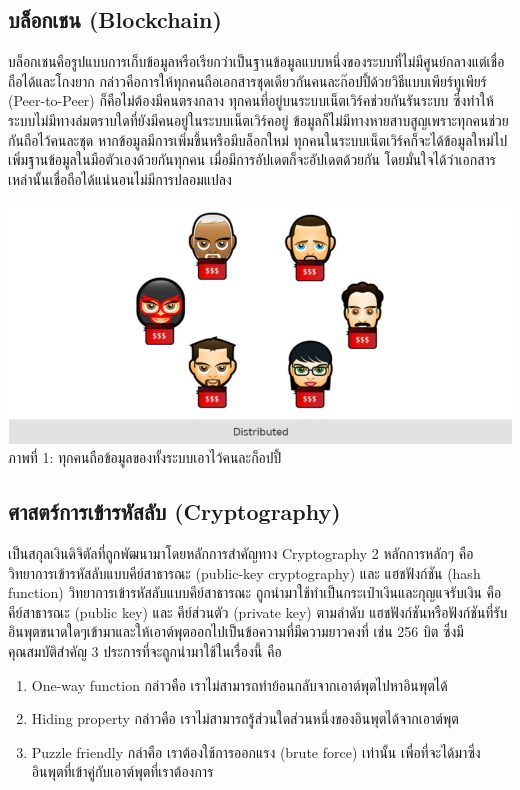\documentclass[letterpaper, 10pt, conference]{ieeeconf}
\begin{document}
\subsection{บล็อกเชน (Blockchain)}
	บล็อกเชนคือรูปแบบการเก็บข้อมูลหรือเรียกว่าเป็นฐานข้อมูลแบบหนึ่งของระบบที่ไม่มีศูนย์กลางแต่เชื่อถือได้และโกงยาก กล่าวคือการให้ทุกคนถือเอกสารชุดเดียวกันคนละก๊อปปี้ด้วยวิธีแบบเพียร์ทูเพียร์ (Peer-to-Peer) ก็คือไม่ต้องมีคนตรงกลาง ทุกคนที่อยู่บนระบบเน็ตเวิร์คช่วยกันรันระบบ ซึ่งทำให้ระบบไม่มีทางล่มตราบใดที่ยังมีคนอยู่ในระบบเน็ตเวิร์คอยู่ ข้อมูลก็ไม่มีทางหายสาบสูญเพราะทุกคนช่วยกันถือไว้คนละชุด หากข้อมูลมีการเพิ่มขึ้นหรือมีบล็อกใหม่ ทุกคนในระบบเน็ตเวิร์คก็จะได้ข้อมูลใหม่ไปเพิ่มฐานข้อมูลในมือตัวเองด้วยกันทุกคน เมื่อมีการอัปเดตก็จะอัปเดตด้วยกัน โดยมั่นใจได้ว่าเอกสารเหล่านั้นเชื่อถือได้แน่นอนไม่มีการปลอมแปลง

	{\centering 
		\includegraphics[scale=0.5]{related-work-1} \\
		ภาพที่ 1: ทุกคนถือข้อมูลของทั้งระบบเอาไว้คนละก็อปปี้ \par 
	}

\subsection{ศาสตร์การเข้ารหัสลับ (Cryptography)}

	\par เป็นสกุลเงินดิจิตัลที่ถูกพัฒนามาโดยหลักการสำคัญทาง Cryptography 2 หลักการหลักๆ คือ วิทยาการเข้ารหัสลับแบบคีย์สาธารณะ (public-key cryptography) และ แฮชฟังก์ชัน (hash function)
	วิทยาการเข้ารหัสลับแบบคีย์สาธารณะ ถูกนำมาใช้ทำเป็นกระเป๋าเงินและกุญแจรับเงิน คือ คีย์สาธารณะ (public key) และ คีย์ส่วนตัว (private key) ตามลำดับ
	แฮชฟังก์ชันหรือฟังก์ชันที่รับอินพุตขนาดใดๆเข้ามาและให้เอาต์พุตออกไปเป็นข้อความที่มีความยาวคงที่ เช่น 256 บิต ซึ่งมีคุณสมบัติสำคัญ 3 ประการที่จะถูกนำมาใช้ในเรื่องนี้ คือ
	\begin{enumerate}
		\item One-way function กล่าวคือ เราไม่สามารถทำย้อนกลับจากเอาต์พุตไปหาอินพุตได้
		\item Hiding property กล่าวคือ เราไม่สามารถรู้ส่วนใดส่วนหนึ่งของอินพุตได้จากเอาต์พุต
		\item Puzzle friendly กล่าคือ เราต้องใช้การออกแรง (brute force) เท่านั้น เพื่อที่จะได้มาซึ่งอินพุตที่เข้าคู่กับเอาต์พุตที่เราต้องการ
	\end{enumerate}
	\medskip
\end{document}
